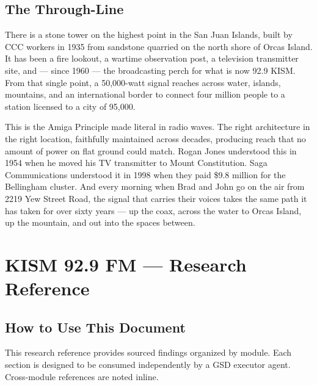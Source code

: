 \documentclass[11pt,letterpaper]{article}
\newcommand{\stageheader}[2]{%
  \noindent\colorbox{#2}{\makebox[\textwidth][l]{%
    \textcolor{white}{\bfseries\sffamily\hspace{6pt}#1\hspace{6pt}}}}%
  \vspace{0.5em}\par%
}
\begin{document}
\subsection{The Through-Line}

There is a stone tower on the highest point in the San Juan Islands, built by CCC workers in 1935 from sandstone quarried on the north shore of Orcas Island. It has been a fire lookout, a wartime observation post, a television transmitter site, and --- since 1960 --- the broadcasting perch for what is now 92.9 KISM. From that single point, a 50,000-watt signal reaches across water, islands, mountains, and an international border to connect four million people to a station licensed to a city of 95,000.

This is the Amiga Principle made literal in radio waves. The right architecture in the right location, faithfully maintained across decades, producing reach that no amount of power on flat ground could match. Rogan Jones understood this in 1954 when he moved his TV transmitter to Mount Constitution. Saga Communications understood it in 1998 when they paid \$9.8 million for the Bellingham cluster. And every morning when Brad and John go on the air from 2219 Yew Street Road, the signal that carries their voices takes the same path it has taken for over sixty years --- up the coax, across the water to Orcas Island, up the mountain, and out into the spaces between.


\newpage
\stageheader{STAGE 2 --- RESEARCH REFERENCE}{secondary}

\section{KISM 92.9 FM --- Research Reference}

\subsection{How to Use This Document}

This research reference provides sourced findings organized by module. Each section is designed to be consumed independently by a GSD executor agent. Cross-module references are noted inline.
\end{document}
